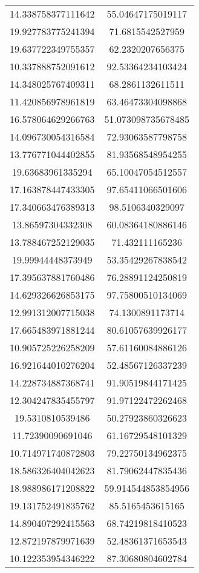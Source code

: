 \begin{table}
\begin{tabular}{cc}
14.338758377111642 & 55.04647175019117 \\
19.927783775241394 & 71.6815542527959 \\
19.637722349755357 & 62.2320207656375 \\
10.337888752091612 & 92.53364234103424 \\
14.348025767409311 & 68.2861132611511 \\
11.420856978961819 & 63.46473304098868 \\
16.578064629266763 & 51.073098735678485 \\
14.096730054316584 & 72.93063587798758 \\
13.776771044402855 & 81.93568548954255 \\
19.63683961335294 & 65.10047054512557 \\
17.163878447433305 & 97.65411066501606 \\
17.340663476389313 & 98.5106340329097 \\
13.86597304332308 & 60.08364180886146 \\
13.788467252129035 & 71.432111165236 \\
19.99944448373949 & 53.35429267838542 \\
17.395637881760486 & 76.28891124250819 \\
14.629326626853175 & 97.75800510134069 \\
12.991312007715038 & 74.1300891173714 \\
17.665483971881244 & 80.61057639926177 \\
10.905725226258209 & 57.61160084886126 \\
16.921644010276204 & 52.48567126337239 \\
14.228734887368741 & 91.90519844171425 \\
12.304247835455797 & 91.97122472262468 \\
19.5310810539486 & 50.27923860326623 \\
11.72390090691046 & 61.16729548101329 \\
10.714971740872803 & 79.22750134962375 \\
18.586326404042623 & 81.79062447835436 \\
18.988986171208822 & 59.914544853854956 \\
19.131752491835762 & 85.5165453615165 \\
14.890407292415563 & 68.74219818410523 \\
12.872197879971639 & 52.48361371653543 \\
10.122353954346222 & 87.30680804602784 \\

\end{tabular}
\end{table}
